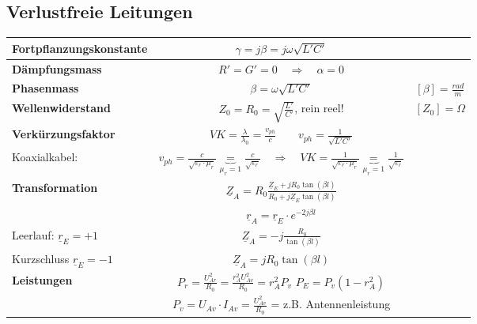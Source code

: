 	
	\subsection{Verlustfreie Leitungen}
		\renewcommand{\arraystretch}{1.5}
		\begin{tabular}{| l | c | c |}
			\hline
				\textbf{Fortpflanzungskonstante}
				& $\gamma=j\beta=j\omega \sqrt{L'C'} $
				&\\
			\hline
				\textbf{Dämpfungsmass}
				& $R'=G'=0\quad \Rightarrow \quad \alpha=0$
				&\\
			\hline
				\textbf{Phasenmass}
				& $\beta=\omega\sqrt{L'C'}$
				& $[\beta] = \frac{rad}{m}$\\
			\hline
				\textbf{Wellenwiderstand}
				& $Z_0 = R_0 =\sqrt{\frac{L'}{C'}}$, rein reel!
				& $[Z_0] = \Omega$\\
			\hline
				\textbf{Verkürzungsfaktor}
				& $ VK = \frac{\lambda}{\lambda_0}=\frac{v_{ph}}{c} \qquad v_{ph} = \frac{1}{\sqrt{L'C'}}$ &\\
				\hfill Koaxialkabel:& $v_{ph} = \frac{c}{\sqrt{\varepsilon_r \cdot \mu_r}}  \underbrace{=}_{\mu_r = 1} \frac{c}{\sqrt{\varepsilon_r}} \quad \Rightarrow \quad VK = \frac{1}{\sqrt{\varepsilon_r \cdot \mu_r}} \underbrace{=}_{\mu_r = 1} \frac{1}{\sqrt{\varepsilon_r}} $ & \\ 
			\hline
				\textbf{Transformation}
				& $\underline{Z}_A=R_0\frac{\underline{Z}_{E}+jR_0\tan(\beta l)}{R_0+j\underline{Z}_{E}\tan(\beta l)}$
				&\\
				& $\underline{r}_A=\underline{r}_E\cdot e^{-2j\beta l}$
				&\\
			\cline{2-3}
				\hfill Leerlauf: $ \underline{r}_E=+1$
				& $\underline{Z}_A=-j\frac{R_0}{\tan(\beta l)}$
				&\\
				\hfill Kurzschluss $ \underline{r}_E=-1$
				& $\underline{Z}_A=j R_0 \tan(\beta l)$
				&\\
			\hline
                 \textbf{Leistungen}
                 &
                 $P_r= \frac{U^2_{Ar}}{R_0}=\frac{r_A^2U^2_{Av}}{R_0}=r_A^2 P_v$\qquad
                 $P_{E}=P_v(1-r_A^2)$ & \\
                 & $P_v = U_{Av} \cdot               I_{Av} = \frac{U^2_{Av}}{R_0}$ = z.B. Antennenleistung &\\
             \hline
		\end{tabular}
